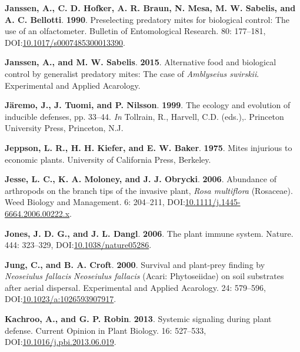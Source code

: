 \documentclass[12pt,final,CPage]{ufthesis}
\newlength{\cslhangindent}
\newenvironment{CSLReferences}[2] %
{%
	\setlength{\parindent}{0pt}
	\ifodd #1 \everypar{\setlength{\hangindent}{\cslhangindent}}\ignorespaces\fi
	\ifnum #2 > 0
	\setlength{\parskip}{#2\baselineskip}
	\fi
}%
{}
\begin{document}
{\begin{CSLReferences}{1}{0}
  \leavevmode{}%
  \textbf{Janssen, A., C. D. Hofker, A. R. Braun, N. Mesa, M. W. Sabelis, and A. C. Bellotti}. \textbf{1990}. Preselecting predatory mites for biological control: The use of an olfactometer. Bulletin of Entomological Research. 80: 177--181, DOI:\href{https://doi.org/10.1017/s0007485300013390}{10.1017/s0007485300013390}.

  \leavevmode{}%
  \textbf{Janssen, A., and M. W. Sabelis}. \textbf{2015}. Alternative food and biological control by generalist predatory mites: The case of {\emph{Amblyseius swirskii}}. Experimental and Applied Acarology.

  \leavevmode{}%
  \textbf{Järemo, J., J. Tuomi, and P. Nilsson}. \textbf{1999}. The ecology and evolution of inducible defenses, pp. 33--44. \emph{In} Tollrain, R., Harvell, C.D. (eds.),. Princeton University Press, Princeton, N.J.

  \leavevmode{}%
  \textbf{Jeppson, L. R., H. H. Kiefer, and E. W. Baker}. \textbf{1975}. Mites injurious to economic plants. University of California Press, Berkeley.

  \leavevmode{}%
  \textbf{Jesse, L. C., K. A. Moloney, and J. J. Obrycki}. \textbf{2006}. Abundance of arthropods on the branch tips of the invasive plant, {\emph{Rosa multiflora}} ({Rosaceae}). Weed Biology and Management. 6: 204--211, DOI:\href{https://doi.org/10.1111/j.1445-6664.2006.00222.x}{10.1111/j.1445-6664.2006.00222.x}.

  \leavevmode{}%
  \textbf{Jones, J. D. G., and J. L. Dangl}. \textbf{2006}. The plant immune system. Nature. 444: 323--329, DOI:\href{https://doi.org/10.1038/nature05286}{10.1038/nature05286}.

  \leavevmode{}%
  \textbf{Jung, C., and B. A. Croft}. \textbf{2000}. Survival and plant-prey finding by {\emph{Neoseiulus fallacis}} {\emph{Neoseiulus fallacis}} ({Acari}: {Phytoseiidae}) on soil substrates after aerial dispersal. Experimental and Applied Acarology. 24: 579--596, DOI:\href{https://doi.org/10.1023/a:1026593907917}{10.1023/a:1026593907917}.

  \leavevmode{}%
  \textbf{Kachroo, A., and G. P. Robin}. \textbf{2013}. Systemic signaling during plant defense. Current Opinion in Plant Biology. 16: 527--533, DOI:\href{https://doi.org/10.1016/j.pbi.2013.06.019}{10.1016/j.pbi.2013.06.019}.


\end{CSLReferences}}
\end{document}
